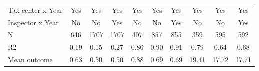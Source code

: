 \begin{tabular}{lccc|ccc|ccc}
\midrule
Tax center x Year&         Yes         &         Yes         &         Yes         &         Yes         &         Yes         &         Yes         &         Yes         &         Yes         &         Yes         \\
Inspector x Year&          No         &          No         &         Yes         &          No         &          No         &         Yes         &          No         &          No         &         Yes         \\
N           &         646         &        1707         &        1707         &         407         &         857         &         855         &         359         &         595         &         592         \\
R2          &        0.19         &        0.15         &        0.27         &        0.86         &        0.90         &        0.91         &        0.79         &        0.64         &        0.68         \\
Mean outcome&        0.63         &        0.50         &        0.50         &        0.88         &        0.69         &        0.69         &       19.41         &       17.72         &       17.71         \\
\bottomrule \end{tabular}
